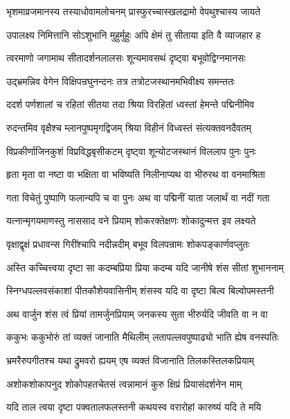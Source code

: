 \twolineshloka
{भृशमाव्रजमानस्य तस्याधोवामलोचनम्}
{प्रास्फुरच्चास्खलद्रामो वेपथुश्चास्य जायते} %

\twolineshloka
{उपालक्ष्य निमित्तानि सोऽशुभानि मुहुर्मुहुः}
{अपि क्षेमं तु सीताया इति वै व्याजहार ह} %

\twolineshloka
{त्वरमाणो जगामाथ सीतादर्शनलालसः}
{शून्यमावसथं दृष्ट्वा बभूवोद्विग्नमानसः} %

\twolineshloka
{उद्भ्रमन्निव वेगेन विक्षिपन्रघुनन्दनः}
{तत्र तत्रोटजस्थानमभिवीक्ष्य समन्ततः} %

\twolineshloka
{ददर्श पर्णशालां च रहितां सीतया तदा}
{श्रिया विरहितां ध्वस्तां हेमन्ते पद्मिनीमिव} %

\twolineshloka
{रुदन्तमिव वृक्षैश्च म्लानपुष्पमृगद्विजम्}
{श्रिया विहीनं विध्वस्तं संत्यक्तवनदैवतम्} %

\twolineshloka
{विप्रकीर्णाजिनकुशं विप्रविद्धबृसीकटम्}
{दृष्ट्वा शून्योटजस्थानं विललाप पुनः पुनः} %

\twolineshloka
{हृता मृता वा नष्टा वा भक्षिता वा भविष्यति}
{निलीनाप्यथ वा भीरुरथ वा वनमाश्रिता} %

\twolineshloka
{गता विचेतुं पुष्पाणि फलान्यपि च वा पुनः}
{अथ वा पद्मिनीं याता जलार्थं वा नदीं गता} %

\twolineshloka
{यत्नान्मृगयमाणस्तु नाससाद वने प्रियाम्}
{शोकरक्तेक्षणः शोकादुन्मत्त इव लक्ष्यते} %

\twolineshloka
{वृक्षाद्वृक्षं प्रधावन्स गिरींश्चापि नदीन्नदीम्}
{बभूव विलपन्रामः शोकपङ्कार्णवप्लुतः} %

\twolineshloka
{अस्ति कच्चित्त्वया दृष्टा सा कदम्बप्रिया प्रिया}
{कदम्ब यदि जानीषे शंस सीतां शुभाननाम्} %

\twolineshloka
{स्निग्धपल्लवसंकाशां पीतकौशेयवासिनीम्}
{शंसस्व यदि वा दृष्टा बिल्व बिल्वोपमस्तनी} %

\twolineshloka
{अथ वार्जुन शंस त्वं प्रियां तामर्जुनप्रियाम्}
{जनकस्य सुता भीरुर्यदि जीवति वा न वा} %

\twolineshloka
{ककुभः ककुभोरुं तां व्यक्तं जानाति मैथिलीम्}
{लतापल्लवपुष्पाढ्यो भाति ह्येष वनस्पतिः} %

\twolineshloka
{भ्रमरैरुपगीतश्च यथा द्रुमवरो ह्ययम्}
{एष व्यक्तं विजानाति तिलकस्तिलकप्रियाम्} %

\twolineshloka
{अशोकशोकापनुद शोकोपहतचेतसं}
{त्वन्नामानं कुरु क्षिप्रं प्रियासंदर्शनेन माम्} %

\twolineshloka
{यदि ताल त्वया दृष्टा पक्वतालफलस्तनी}
{कथयस्व वरारोहां कारुष्यं यदि ते मयि} %

